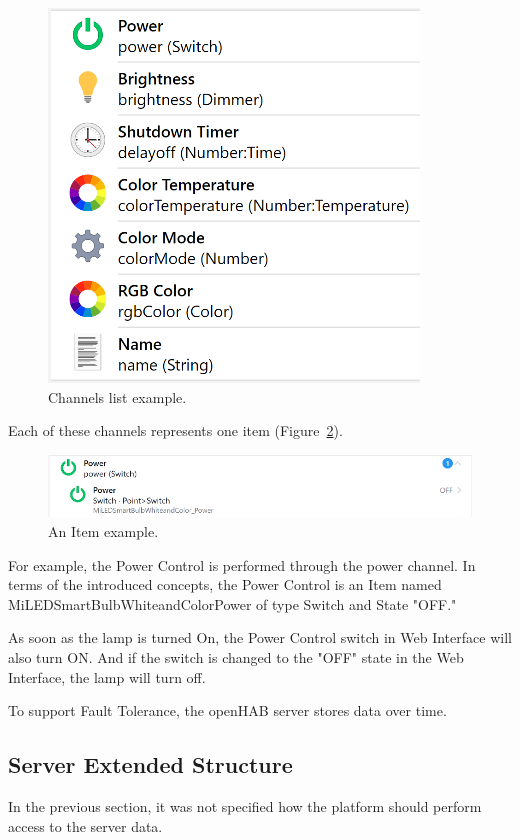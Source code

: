 \begin{figure}
  \centering
  \includegraphics[width=0.6\linewidth]{figures/XiaomiLampChannels.png}
  \caption{Channels list example.}
  \label{fig:XiaomiLampChannels-figure}
\end{figure}

Each of these channels represents one item (Figure~\ref{fig:XiaomiLampPowerItem-figure}).

\begin{figure}
  \centering
  \includegraphics[width=0.9\linewidth]{figures/XiaomiLampPowerItem.png}
  \caption{An Item example.}
  \label{fig:XiaomiLampPowerItem-figure}
\end{figure}

For example, the Power Control is performed through the power channel. In terms of the introduced concepts, the Power Control is an Item named MiLEDSmartBulbWhiteandColorPower of type Switch and State "OFF."

As soon as the lamp is turned On, the Power Control switch in Web Interface will also turn ON. And if the switch is changed to the "OFF" state in the Web Interface, the lamp will turn off.

To support Fault Tolerance, the openHAB server stores data over time.

\subsection{Server Extended Structure}

In the previous section, it was not specified how the platform should perform access to the server data. 

